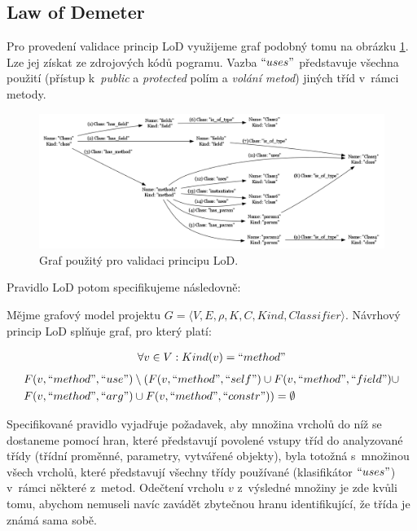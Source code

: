 \subsection{Law of Demeter}
Pro provedení validace princip LoD využijeme graf podobný tomu na obrázku \ref{implementation-lod_graph}. Lze jej získat ze zdrojových kódů pogramu. Vazba $``uses"$ představuje všechna použití (přístup k~\emph{public} a \emph{protected} polím a \emph{volání metod}) jiných tříd v~rámci metody.

\begin{figure}[h!]
  \centering
  \includegraphics[width=1.0\textwidth]{./graphs/demeter_graph.png}
  \caption{Graf použitý pro validaci principu LoD.\label{implementation-lod_graph}}
\end{figure}

Pravidlo LoD potom specifikujeme následovně:

\begin{designprinciple}
Mějme grafový model projektu $G = \langle V, E, \rho, K, C, \mathit{Kind}, \mathit{Classifier}\rangle$. Návrhový princip LoD splňuje graf, pro který platí:

\begin{align*}
\forall v \in V: Kind(v) = ``method"\\
\end{align*}
\begin{align*}
&F(v, ``method", ``use") \setminus ( F(v, ``method", ``self") \cup F(v, ``method", ``field") \cup \\
&F(v, ``method", ``arg") \cup F(v, ``method", ``constr")) = \emptyset
\end{align*}

\end{designprinciple}

Specifikované pravidlo vyjadřuje požadavek, aby množina vrcholů do níž se dostaneme pomocí hran, které představují povolené vstupy tříd do analyzované třídy (třídní proměnné, parametry, vytvářené objekty), byla totožná s~množinou všech vrcholů, které představují všechny třídy používané (klasifikátor $``uses"$) v~rámci některé z~metod. Odečtení vrcholu $v$ z~výsledné množiny je zde kvůli tomu, abychom nemuseli navíc zavádět zbytečnou hranu identifikující, že třída je známá sama sobě.

